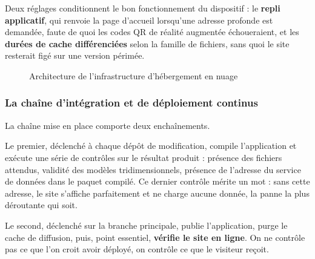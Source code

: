 Deux réglages conditionnent le bon fonctionnement du dispositif : le
\textbf{repli applicatif}, qui renvoie la page d'accueil lorsqu'une adresse
profonde est demandée, faute de quoi les codes QR de réalité augmentée
échoueraient, et les \textbf{durées de cache différenciées} selon la famille de
fichiers, sans quoi le site resterait figé sur une version périmée.

\begin{figure}[htbp]
\centering
{}
\caption{Architecture de l'infrastructure d'hébergement en nuage}
\label{fig:cloud}
\end{figure}

\subsubsection{La chaîne d'intégration et de déploiement continus}

La chaîne mise en place comporte deux enchaînements.

Le premier, déclenché à chaque dépôt de modification, compile l'application et
exécute une série de contrôles sur le résultat produit : présence des fichiers
attendus, validité des modèles tridimensionnels, présence de l'adresse du
service de données dans le paquet compilé. Ce dernier contrôle mérite un mot :
sans cette adresse, le site s'affiche parfaitement et ne charge aucune donnée, la panne la plus déroutante qui soit.

Le second, déclenché sur la branche principale, publie l'application, purge le
cache de diffusion, puis, point essentiel, \textbf{vérifie le site en ligne}.
On ne contrôle pas ce que l'on croit avoir déployé, on contrôle ce que le
visiteur reçoit.

